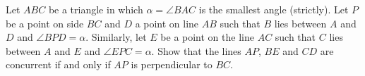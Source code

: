 Let $ABC$ be a triangle in which $\alpha=\angle BAC$ is the smallest angle (strictly).
Let $P$ be a point on side $BC$ and $D$ a point on line $AB$ such that $B$ lies
between $A$ and $D$ and $\angle BPD=\alpha$. Similarly, let $E$ be a point on the
line $AC$ such that $C$ lies between $A$ and $E$ and $\angle EPC=\alpha$.
Show that the lines $AP$, $BE$ and $CD$ are concurrent if and only if $AP$ is perpendicular to $BC$.